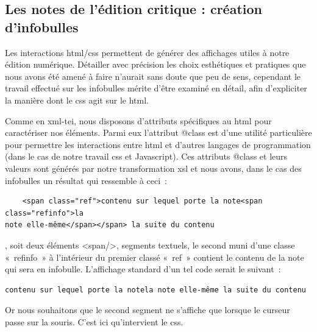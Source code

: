 \subsection{Les notes de l'édition critique : création d'infobulles}

\label{htmlCssInfo}


Les interactions html/css permettent de générer des affichages utiles à notre édition numérique. Détailler avec précision les choix esthétiques et pratiques que nous avons été amené à faire n'aurait sans doute que peu de sens, cependant le travail effectué sur les infobulles mérite d'être examiné en détail, afin d'expliciter la manière dont le css agit sur le html.




Comme en xml-tei, nous disposons d'attributs spécifiques au html pour caractériser nos éléments. Parmi eux l'attribut @class est d'une utilité particulière pour permettre les interactions entre html et d'autres langages de programmation (dans le cas de notre travail css et Javascript). Ces attributs @class et leurs valeurs sont générés par notre transformation xsl et nous avons, dans le cas des infobulles un résultat qui ressemble à ceci~:

\begin{verbatim}
    <span class="ref">contenu sur lequel porte la note<span class="refinfo">la
note elle-même</span></span> la suite du contenu
\end{verbatim}
, soit deux éléments <span/>, segments textuels, le second muni d'une classe «~refinfo~» à l'intérieur du premier classé «~ref~» contient le contenu de la note qui sera en infobulle. L'affichage standard d'un tel code serait le suivant~:
\begin{verbatim}contenu sur lequel porte la notela note elle-même la suite du contenu\end{verbatim}
Or nous souhaitons que le second segment ne s'affiche que lorsque le curseur passe sur la souris. C'est ici qu'intervient le css.

